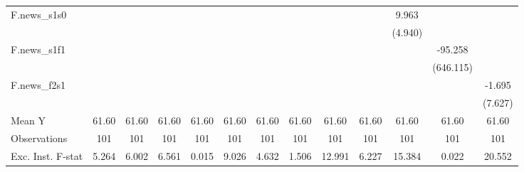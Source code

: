 {\begin{tabular}{l*{12}{c}}
\addlinespace
F.news\_s1s0 &                     &                     &                     &                     &                     &                     &                     &                     &                     &       9.963\sym{**} &                     &                     \\
            &                     &                     &                     &                     &                     &                     &                     &                     &                     &     (4.940)         &                     &                     \\
\addlinespace
F.news\_s1f1 &                     &                     &                     &                     &                     &                     &                     &                     &                     &                     &     -95.258         &                     \\
            &                     &                     &                     &                     &                     &                     &                     &                     &                     &                     &   (646.115)         &                     \\
\addlinespace
F.news\_f2s1 &                     &                     &                     &                     &                     &                     &                     &                     &                     &                     &                     &      -1.695         \\
            &                     &                     &                     &                     &                     &                     &                     &                     &                     &                     &                     &     (7.627)         \\
\midrule
Mean Y      &       61.60         &       61.60         &       61.60         &       61.60         &       61.60         &       61.60         &       61.60         &       61.60         &       61.60         &       61.60         &       61.60         &       61.60         \\
Observations&         101         &         101         &         101         &         101         &         101         &         101         &         101         &         101         &         101         &         101         &         101         &         101         \\
Exc. Inst. F-stat&       5.264         &       6.002         &       6.561         &       0.015         &       9.026         &       4.632         &       1.506         &      12.991         &       6.227         &      15.384         &       0.022         &      20.552         \\
\bottomrule
\end{tabular}
}
